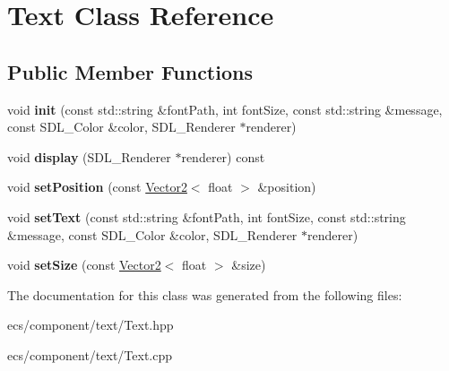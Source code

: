\hypertarget{class_text}{}\section{Text Class Reference}
\label{class_text}
\subsection*{Public Member Functions}
\begin{DoxyCompactItemize}
\item 
\mbox{\label{class_text_ad97e6a6037eecb0777fd3fce47126610}} 
void {\bfseries init} (const std\+::string \&font\+Path, int font\+Size, const std\+::string \&message, const S\+D\+L\+\_\+\+Color \&color, S\+D\+L\+\_\+\+Renderer $\ast$renderer)
\item 
\mbox{\label{class_text_a067064ef9f655bbad7028af4a5d9f068}} 
void {\bfseries display} (S\+D\+L\+\_\+\+Renderer $\ast$renderer) const
\item 
\mbox{\label{class_text_a120c775b894251bb2c688a86effe533a}} 
void {\bfseries set\+Position} (const \mbox{\hyperlink{class_vector2}{Vector2}}$<$ float $>$ \&position)
\item 
\mbox{\label{class_text_a2bd6e34581aa2e7a64da31c23d63a797}} 
void {\bfseries set\+Text} (const std\+::string \&font\+Path, int font\+Size, const std\+::string \&message, const S\+D\+L\+\_\+\+Color \&color, S\+D\+L\+\_\+\+Renderer $\ast$renderer)
\item 
\mbox{\label{class_text_a8885062175c71c77542e3c05eabc4c30}} 
void {\bfseries set\+Size} (const \mbox{\hyperlink{class_vector2}{Vector2}}$<$ float $>$ \&size)
\end{DoxyCompactItemize}


The documentation for this class was generated from the following files\+:\begin{DoxyCompactItemize}
\item 
ecs/component/text/Text.\+hpp\item 
ecs/component/text/Text.\+cpp\end{DoxyCompactItemize}

